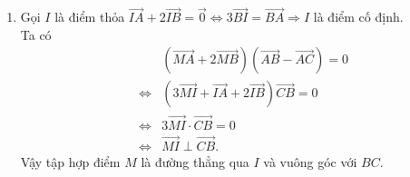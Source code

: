 \begin{bt}
{\begin{enumerate}
	\item Gọi $ I $ là điểm thỏa $ \vec{IA} + 2\vec{IB} = \vec{0} \Leftrightarrow 3\vec{BI} = \vec{BA} \Rightarrow I $ là điểm cố định.\\
	Ta có
	\begin{eqnarray*}
	&&\left(\vec{MA} + 2\vec{MB}\right)\left(\vec{AB} - \vec{AC}\right) = 0\\
	& \Leftrightarrow & \left(3\vec{MI} + \vec{IA} + 2\vec{IB}\right)\vec{CB} = 0\\
	& \Leftrightarrow & 3\vec{MI} \cdot \vec{CB} = 0\\
	& \Leftrightarrow & \vec{MI} \perp \vec{CB}.
	\end{eqnarray*}
	Vậy tập hợp điểm $ M $ là đường thẳng qua $ I $ và vuông góc với $ BC $.
\end{enumerate}
}
\end{bt}